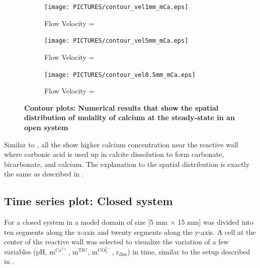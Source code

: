 \begin{figure}[!h]
\centering
    \begin{subfigure}{.5\linewidth}
        \centering
        \texttt{[image: PICTURES/contour\_vel1mm\_mCa.eps]}
        \caption{\small Flow Velocity = }
        \label{fig:CaSteady-state}       %
    \end{subfigure}%
    \hfill
    \begin{subfigure}{.5\linewidth}
        \centering
        \texttt{[image: PICTURES/contour\_vel5mm\_mCa.eps]}
        \caption{\small Flow Velocity = }
        \label{fig:CaSteady-state5mm}       %
    \end{subfigure}%
    \hfill
    \begin{subfigure}{.5\linewidth}
        \centering
        \texttt{[image: PICTURES/contour\_vel0.5mm\_mCa.eps]}
        \caption{\small Flow Velocity = }
        \label{fig:CaSteady-state0.5mm}       %
    \end{subfigure}%
    \caption [\DuMuX Contour plots: Numerical results that show the spatial distribution of molality of calcium at the steady-state in an open system] {\textbf{\DuMuX Contour plots: Numerical results that show the spatial distribution of molality of calcium at the steady-state in an open system}}
     \label{fig:contourCa}
\end{figure}

Similar to , all the  show higher 
calcium concentration near the reactive wall where carbonic acid is used up in calcite dissolution to form carbonate, bicarbonate, and calcium. 
The explanation to the spatial distribution is exactly the same as described in .


\subsection{Time series plot: Closed system} \label{ssec:timeSeriesClosed}
For a closed system in \DuMuX a model domain of size [5 mm $\times$ 15 mm] was divided into ten segments along the x-axis and twenty segments along the y-axis.
A cell at the center of the reactive wall was selected to visualize the variation of a few variables (pH, $\mathrm{m^{Ca^{2+}}}$, $\mathrm{m^{TIC}}$, 
$\mathrm{m^{CO_3^{2-}}}$, $\mathrm{r_{diss}}$) in time, similar to the setup described in .


